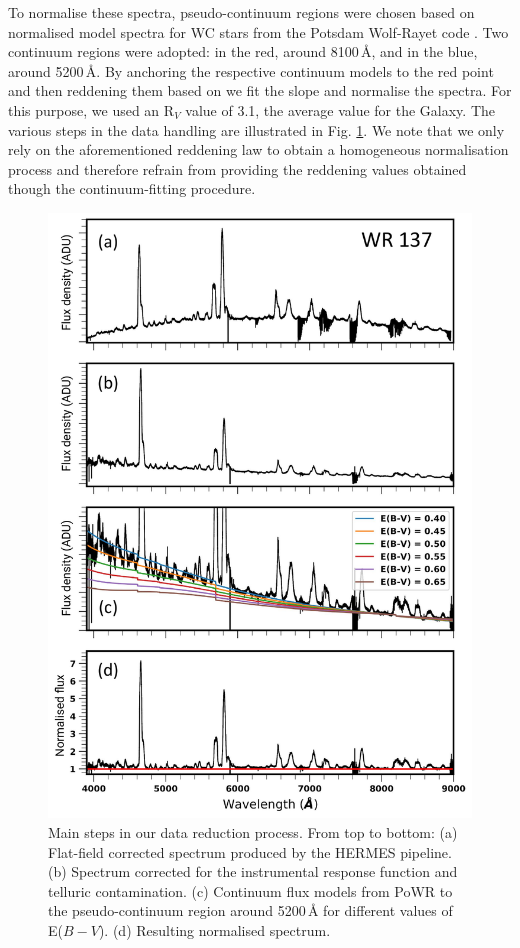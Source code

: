 To normalise these spectra, pseudo-continuum regions were chosen based on normalised model spectra for WC stars from the Potsdam Wolf-Rayet code \citep[PoWR:][]{grafener_line-blanketed_2002,hamann_temperature_2003,sander_galactic_2012}. Two continuum regions were adopted: in the red, around 8100\,\r{A}, and in the blue, around 5200\,\r{A}. By anchoring the respective continuum models to the red point and then reddening them based on \citet{fitzpatrick_interstellar_2004} we fit the slope and normalise the spectra. For this purpose, we used an R$_V$ value of 3.1, the average value for the Galaxy. The various steps in the data handling are illustrated in Fig. \ref{fig:custom_pipeline}. We note that we only rely on the aforementioned reddening law to obtain a homogeneous normalisation process and therefore refrain from providing the reddening values obtained though the continuum-fitting procedure.

\begin{figure}
    \centering
    \includegraphics[width=\hsize]{chapters/WC/image/CombinedSteps_paper.pdf}
    \caption{Main steps in our data reduction process. From top to bottom: (a) Flat-field corrected spectrum produced by the HERMES pipeline. (b) Spectrum corrected for the instrumental response function and telluric contamination. (c) Continuum flux models from PoWR to the pseudo-continuum region around 5200\,\r{A} for different values of E($B-V$). (d) Resulting normalised spectrum.}
    \label{fig:custom_pipeline}
\end{figure}
